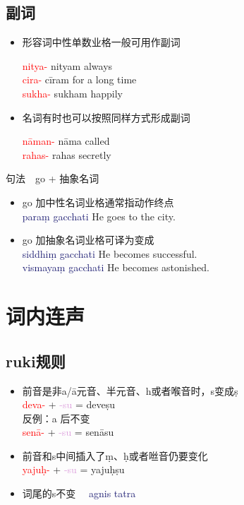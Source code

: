 \documentclass[17pt]{beamer}
\newcommand{\nounstem}[1]{\textcolor{red}{#1\nobreakdash-}}
\newcommand{\fullpada}[1]{\textcolor{OliveGreen}{#1}}
\newcommand{\pratyaya}[1]{\textcolor{Plum}{#1}}
\newcommand{\fullsentence}[1]{\textcolor{MidnightBlue}{#1}}
\begin{document}
\subsection{副词}
\begin{frame}{\insertsubsection }
  \small
  \begin{itemize}
    \item 形容词中性单数业格一般可用作副词
    
    \nounstem{nitya} \fullpada{nityam} always \\
    \nounstem{cira} \fullpada{cīram} for a long time \\
    \nounstem{sukha} \fullpada{sukham} happily
    \item 名词有时也可以按照同样方式形成副词
    
    \nounstem{nāman} \fullpada{nāma} called \\
    \nounstem{rahas} \fullpada{rahas} secretly
  \end{itemize}
\end{frame}

\begin{frame}{句法~~go + 抽象名词}
  \small
  \begin{itemize}
    \item go 加中性名词业格通常指动作终点\\     
    \fullsentence{paraṃ gacchati}  He goes to the city. 
    \item go 加抽象名词业格可译为变成 \\
    \fullsentence{siddhiṃ gacchati}  He becomes successful. \\
    \fullsentence{vismayaṃ gacchati}  He becomes astonished. 
  \end{itemize}  
\end{frame}

\section{词内连声}
\begin{frame}{\insertsection }
  \small
  \tableofcontents[currentsection]
\end{frame}

\subsection{ruki规则}
\small
\begin{frame}{\insertsection }
  \begin{itemize}
    \item 前音是非a/ā元音、半元音、h或者喉音时，s变成ṣ\\
    \nounstem{deva} + \pratyaya{\nobreakdash-su} = \fullpada{deveṣu}\\
    反例：a 后不变 \\ \nounstem{senā} + \pratyaya{\nobreakdash-su} = \fullpada{senāsu}
    \item 前音和s中间插入了ṃ、ḥ或者咝音仍要变化\\
    \nounstem{yajuḥ} + \pratyaya{\nobreakdash-su} = \fullpada{yajuḥṣu}
    \item 词尾的s不变 
    ~~\fullsentence{agnis tatra} 
  \end{itemize}
\end{frame}
\end{document}
